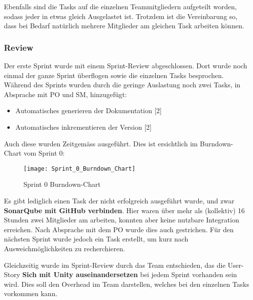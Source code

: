\documentclass[../main.tex]{subfiles}
\begin{document}
	\par Ebenfalls sind die Tasks auf die einzelnen Teammitgliedern aufgeteilt worden, sodass jeder in etwas gleich Ausgelastet ist. Trotzdem ist die Vereinbarung so, dass bei Bedarf natürlich mehrere Mitglieder am gleichen Task arbeiten können.


	\subsubsection{Review}
	\label{section:Review}
	\par Der erste Sprint wurde mit einem Sprint-Review abgeschlossen. Dort wurde noch einmal der ganze Sprint überflogen sowie die einzelnen Tasks besprochen. Während des Sprints wurden durch die geringe Auslastung noch zwei Tasks, in Absprache mit PO und SM, hinzugefügt:
	
	\begin{itemize}
		\item Automatisches generieren der Dokumentation [2]
		\item Automatisches inkrementieren der Version [2]
	\end{itemize}

	Auch diese wurden Zeitgemäss ausgeführt. Dies ist ersichtlich im Burndown-Chart vom Sprint 0:
	
	\begin{figure}[H]
		\centering
		\texttt{[image: Sprint\_0\_Burndown\_Chart]}
		\caption{Sprint 0 Burndown-Chart}
	\end{figure}

	\par Es gibt lediglich einen Task der nicht erfolgreich ausgeführt wurde, und zwar \textbf{SonarQube mit GitHub verbinden}. Hier waren über mehr als (kollektiv) 16 Stunden zwei Mitglieder am arbeiten, konnten aber keine nutzbare Integration erreichen. Nach Absprache mit dem PO wurde dies auch gestrichen. Für den nächsten Sprint wurde jedoch ein Task erstellt, um kurz nach Ausweichmöglichkeiten zu recherchieren.
	
	\par Gleichzeitig wurde im Sprint-Review durch das Team entschieden, das die User-Story \textbf{Sich mit Unity auseinandersetzen} bei jedem Sprint vorhanden sein wird. Dies soll den Overhead im Team darstellen, welches bei den einzelnen Tasks vorkommen kann.
\end{document}
